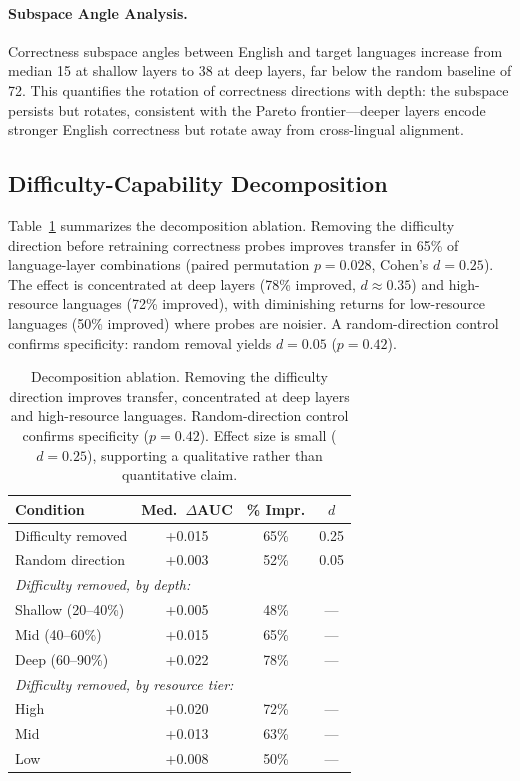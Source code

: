 \documentclass[11pt,a4paper]{article}
\begin{document}
\paragraph{Subspace Angle Analysis.}
Correctness subspace angles between English and target languages increase from median 15\textdegree{} at shallow layers to 38\textdegree{} at deep layers, far below the random baseline of 72\textdegree.
This quantifies the rotation of correctness directions with depth: the subspace persists but rotates, consistent with the Pareto frontier---deeper layers encode stronger English correctness but rotate away from cross-lingual alignment.

\subsection{Difficulty-Capability Decomposition}
\label{sec:decomp}

Table~\ref{tab:decomp} summarizes the decomposition ablation.
Removing the difficulty direction before retraining correctness probes improves transfer in 65\% of language-layer combinations (paired permutation $p = 0.028$, Cohen's $d = 0.25$).
The effect is concentrated at deep layers (78\% improved, $d \approx 0.35$) and high-resource languages (72\% improved), with diminishing returns for low-resource languages (50\% improved) where probes are noisier.
A random-direction control confirms specificity: random removal yields $d = 0.05$ ($p = 0.42$).

\begin{table}[t]
\centering
\small
\begin{tabular}{lccc}
\toprule
\textbf{Condition} & \textbf{Med.\ $\Delta$AUC} & \textbf{\% Impr.} & $d$ \\
\midrule
Difficulty removed & +0.015 & 65\% & 0.25 \\
Random direction & +0.003 & 52\% & 0.05 \\
\midrule
\multicolumn{4}{l}{\small \textit{Difficulty removed, by depth:}} \\
\quad Shallow (20--40\%) & +0.005 & 48\% & --- \\
\quad Mid (40--60\%) & +0.015 & 65\% & --- \\
\quad Deep (60--90\%) & +0.022 & 78\% & --- \\
\midrule
\multicolumn{4}{l}{\small \textit{Difficulty removed, by resource tier:}} \\
\quad High & +0.020 & 72\% & --- \\
\quad Mid & +0.013 & 63\% & --- \\
\quad Low & +0.008 & 50\% & --- \\
\bottomrule
\end{tabular}
\caption{Decomposition ablation. Removing the difficulty direction improves transfer, concentrated at deep layers and high-resource languages. Random-direction control confirms specificity ($p = 0.42$). Effect size is small ($d = 0.25$), supporting a qualitative rather than quantitative claim.}
\label{tab:decomp}
\end{table}
\end{document}
